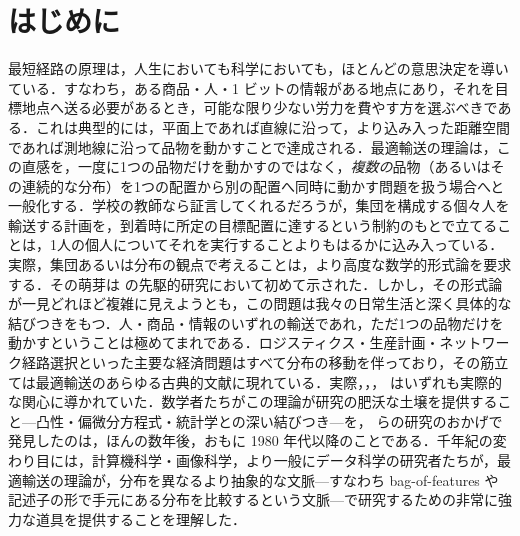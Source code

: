 
\chapter{はじめに}
\label{c-intro}

最短経路の原理は，人生においても科学においても，ほとんどの意思決定を導いている．すなわち，ある商品・人・1 ビットの情報がある地点にあり，それを目標地点へ送る必要があるとき，可能な限り少ない労力を費やす方を選ぶべきである．これは典型的には，平面上であれば直線に沿って，より込み入った距離空間であれば測地線に沿って品物を動かすことで達成される．最適輸送の理論は，この直感を，一度に1つの品物だけを動かすのではなく，\emph{複数の}品物（あるいはその連続的な分布）を1つの配置から別の配置へ同時に動かす問題を扱う場合へと一般化する．学校の教師なら証言してくれるだろうが，集団を構成する個々人を輸送する計画を，到着時に所定の目標配置に達するという制約のもとで立てることは，1人の個人についてそれを実行することよりもはるかに込み入っている．実際，集団あるいは分布の観点で考えることは，より高度な数学的形式論を要求する．その萌芽は \citet{Monge1781} の先駆的研究において初めて示された．しかし，その形式論が一見どれほど複雑に見えようとも，この問題は我々の日常生活と深く具体的な結びつきをもつ．人・商品・情報のいずれの輸送であれ，ただ1つの品物だけを動かすということは極めてまれである．ロジスティクス・生産計画・ネットワーク経路選択といった主要な経済問題はすべて分布の移動を伴っており，その筋立ては最適輸送のあらゆる古典的文献に現れている．実際，\citet{tolstoi1930methods}，\citet{Hitchcock41}，\citet{Kantorovich42} はいずれも実際的な関心に導かれていた．数学者たちがこの理論が研究の肥沃な土壌を提供すること---凸性・偏微分方程式・統計学との深い結びつき---を，\citet{Brenier91} らの研究のおかげで発見したのは，ほんの数年後，おもに 1980 年代以降のことである．千年紀の変わり目には，計算機科学・画像科学，より一般にデータ科学の研究者たちが，最適輸送の理論が，分布を異なるより抽象的な文脈---すなわち bag-of-features や記述子の形で手元にある分布を比較するという文脈---で研究するための非常に強力な道具を提供することを理解した．
%


